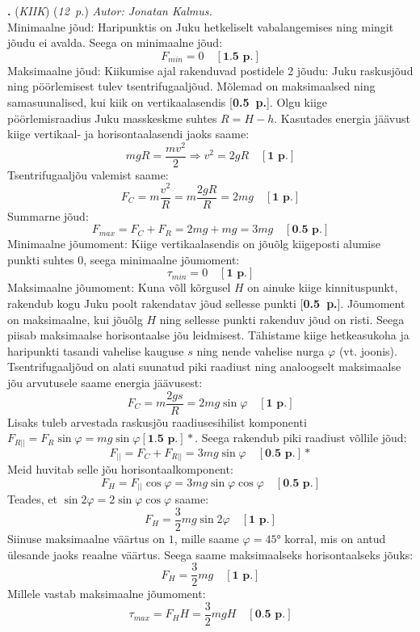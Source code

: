 \documentclass[12pt,a5paper]{article}
\newcommand{\numb}[1]{\vspace{5pt}\textbf{\large #1}}
\newcommand{\nimi}[1]{(\textsl{\small #1})}
\newcommand{\punktid}[1]{(\emph{#1~p.})}
\newcounter{ylesanne}
\newcommand{\yl}[1]{\addtocounter{ylesanne}{1}\numb{\theylesanne.} \nimi{#1} \newblock{}}
\newcommand{\pp}[1]{[\textbf{#1~p.}]}
\newcommand{\autor}[1]{\emph{ Autor: #1.\\}}
\begin{document}
\yl{KIIK} \punktid{12} \autor{Jonatan Kalmus}	
\osa Minimaalne jõud: Haripunktis on Juku hetkeliselt vabalangemises ning mingit jõudu ei avalda. Seega on minimaalne jõud: 
$$F_{min} = 0 \quad\pp{1.5}$$ 
Maksimaalne jõud: Kiikumise ajal rakenduvad postidele 2 jõudu: Juku raskusjõud ning pöörlemisest tulev tsentrifugaaljõud. Mõlemad on maksimaalsed ning samasuunalised, kui kiik on vertikaalasendis \pp{0.5}. Olgu kiige pöörlemisraadius Juku masskeskme suhtes $R = H-h$. Kasutades energia jäävust kiige vertikaal- ja horisontaalasendi jaoks saame: 
$$mgR = \frac{mv^2}{2} \Rightarrow v^2 = 2gR \quad\pp{1}$$ 
Tsentrifugaaljõu valemist saame:
$$F_C = m\frac{v^2}{R} = m\frac{2gR}{R} = 2mg \quad\pp{1}$$ 
Summarne jõud:
$$F_{max} = F_C + F_R = 2mg + mg = 3mg \quad\pp{0.5}$$ 
\osa Minimaalne jõumoment: Kiige vertikaalasendis on jõuõlg kiigeposti alumise punkti suhtes $0$, seega minimaalne jõumoment:
$$\tau_{min} = 0\quad\pp{1}$$ 
Maksimaalne jõumoment: Kuna võll kõrgusel $H$ on ainuke kiige kinnituspunkt, rakendub kogu Juku poolt rakendatav jõud sellesse punkti \pp{0.5}. Jõumoment on maksimaalne, kui jõuõlg $H$ ning sellesse punkti rakenduv jõud on risti. Seega piisab maksimaalse horisontaalse jõu leidmisest. Tähistame kiige hetkeasukoha ja haripunkti tasandi vahelise kauguse $s$ ning nende vahelise nurga $\varphi$ (vt. joonis). Tsentrifugaaljõud on alati suunatud piki raadiust ning analoogselt maksimaalse jõu arvutusele saame energia jäävusest:
$$F_C = m\frac{2gs}{R} = 2mg\sin{\varphi}\quad\pp{1}$$ 
Lisaks tuleb arvestada raskusjõu raadiusesihilist komponenti $F_{R||} = F_R\sin{\varphi} = mg\sin{\varphi}\pp{1.5}*$.
Seega rakendub piki raadiust võllile jõud:
$$F_{||} = F_C + F_{R||} = 3mg\sin{\varphi}\quad\pp{0.5}*$$ 
Meid huvitab selle jõu horisontaalkomponent:
$$F_H = F_{||}\cos{\varphi} = 3mg\sin{\varphi}\cos{\varphi}\quad\pp{0.5}$$ 
Teades, et $\sin{2\varphi}=2\sin{\varphi}\cos{\varphi}$ saame:
$$F_H = \frac{3}{2}mg\sin{2\varphi}\quad\pp{1}$$ 
Siinuse maksimaalne väärtus on $1$, mille saame $\varphi = \ang{45}$ korral, mis on antud ülesande jaoks reaalne väärtus. Seega saame maksimaalseks horisontaalseks jõuks:
$$F_H = \frac{3}{2}mg\quad\pp{1}$$ 
Millele vastab maksimaalne jõumoment:
$$\tau_{max} = F_HH = \frac{3}{2}mgH\quad\pp{0.5}$$ 
\end{document}
